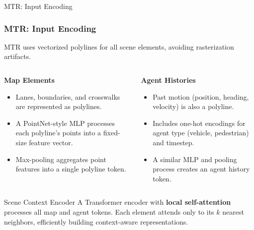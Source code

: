 \documentclass[10pt,aspectratio=169]{beamer}
\begin{document}
\begin{frame}{MTR: Input Encoding}
    \frametitle{MTR: Input Encoding}
    MTR uses vectorized polylines for all scene elements, avoiding rasterization artifacts.
    \begin{columns}[T]
        \begin{column}{0.5\textwidth}
            \textbf{Map Elements}
            \begin{itemize}
                \item Lanes, boundaries, and crosswalks are represented as polylines.
                \item A PointNet-style MLP processes each polyline's points into a fixed-size feature vector.
                \item Max-pooling aggregates point features into a single polyline token.
            \end{itemize}
        \end{column}
        \begin{column}{0.5\textwidth}
            \textbf{Agent Histories}
            \begin{itemize}
                \item Past motion (position, heading, velocity) is also a polyline.
                \item Includes one-hot encodings for agent type (vehicle, pedestrian) and timestep.
                \item A similar MLP and pooling process creates an agent history token.
            \end{itemize}
        \end{column}
    \end{columns}
    \vfill
    \begin{block}{Scene Context Encoder}
        A Transformer encoder with \textbf{local self-attention} processes all map and agent tokens. Each element attends only to its $k$ nearest neighbors, efficiently building context-aware representations.
    \end{block}
\end{frame}
\end{document}
